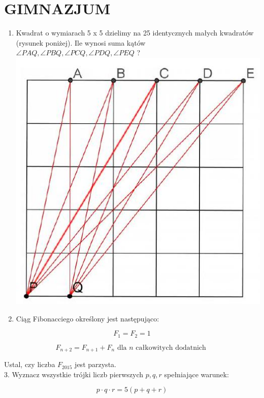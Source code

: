 \documentclass[10pt]{article}
\begin{document}
\section*{GIMNAZJUM}
\begin{enumerate}
  \item Kwadrat o wymiarach 5 x 5 dzielimy na 25 identycznych małych kwadratów (rysunek poniżej). Ile wynosi suma kątów \(\angle P A Q, \angle P B Q, \angle P C Q, \angle P D Q, \angle P E Q\) ?\\
\includegraphics[max width=\textwidth, center]{2024_11_21_4c68055ab3cf36522636g-1}
  \item Ciąg Fibonacciego określony jest następująco:
\end{enumerate}

\[
F_{1}=F_{2}=1
\]

\[
F_{n+2}=F_{n+1}+F_{n} \text { dla } n \text { całkowitych dodatnich }
\]

Ustal, czy liczba \(F_{2015}\) jest parzysta.\\
3. Wyznacz wszystkie trójki liczb pierwszych \(p, q, r\) spełniające warunek:

\[
p \cdot q \cdot r=5(p+q+r)
\]
\end{document}
